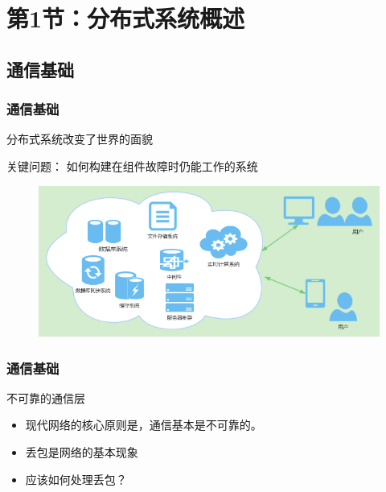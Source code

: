     \section{第1节：分布式系统概述} %
    \subsection{通信基础} %
    \begin{frame}[fragile]
        \frametitle{通信基础}
        分布式系统改变了世界的面貌
        
        关键问题：  如何构建在组件故障时仍能工作的系统　
        
        
        
            \begin{figure}
            \includegraphics[width=0.8\linewidth]{figs/distributed.png}
            \end{figure}
    \end{frame}
\begin{frame}[fragile]
    \frametitle{通信基础}
    不可靠的通信层
    \begin{itemize}
        \item 现代网络的核心原则是，通信基本是不可靠的。
        \item 丢包是网络的基本现象
        \item 应该如何处理丢包？
    \end{itemize}
\end{frame}
